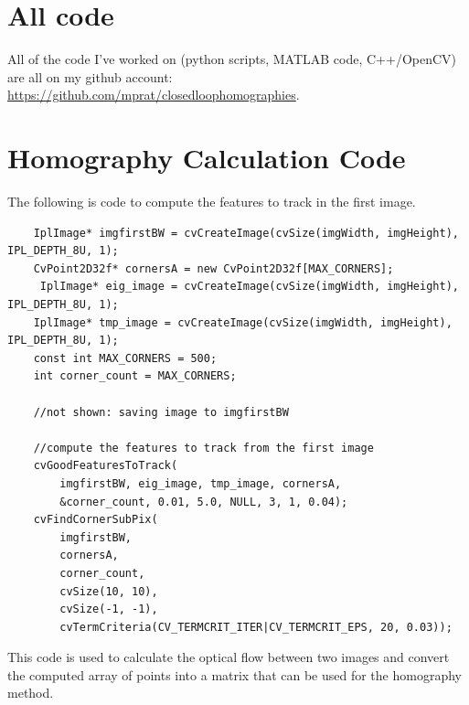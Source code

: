\documentclass{article}
\begin{document}
\appendix
\section{All code}

All of the code I've worked on (python scripts, MATLAB code, C++/OpenCV) are all on my github account: \url{https://github.com/mprat/closedloophomographies}.

\section{Homography Calculation Code}
\label{apdx:code}

The following is code to compute the features to track in the first image.

\begin{verbatim}
    IplImage* imgfirstBW = cvCreateImage(cvSize(imgWidth, imgHeight), IPL_DEPTH_8U, 1);
    CvPoint2D32f* cornersA = new CvPoint2D32f[MAX_CORNERS];
     IplImage* eig_image = cvCreateImage(cvSize(imgWidth, imgHeight), IPL_DEPTH_8U, 1);
    IplImage* tmp_image = cvCreateImage(cvSize(imgWidth, imgHeight), IPL_DEPTH_8U, 1);
    const int MAX_CORNERS = 500;
    int corner_count = MAX_CORNERS;
 
    //not shown: saving image to imgfirstBW

    //compute the features to track from the first image
    cvGoodFeaturesToTrack(
        imgfirstBW, eig_image, tmp_image, cornersA, 
        &corner_count, 0.01, 5.0, NULL, 3, 1, 0.04);
    cvFindCornerSubPix(
        imgfirstBW, 
        cornersA, 
        corner_count, 
        cvSize(10, 10), 
        cvSize(-1, -1), 
        cvTermCriteria(CV_TERMCRIT_ITER|CV_TERMCRIT_EPS, 20, 0.03));
\end{verbatim}

This code is used to calculate the optical flow between two images and convert
the computed array of points into a matrix that can be used for the homography
method.
\end{document}
